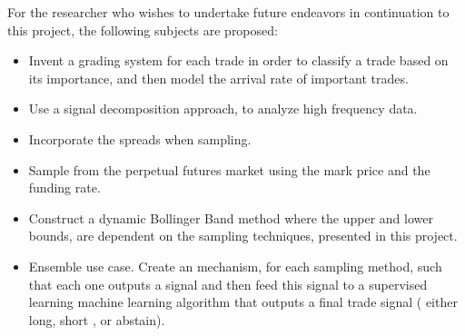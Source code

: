 For the researcher who wishes to undertake future endeavors in continuation to this project, the following subjects are proposed:
\begin{itemize}
\item Invent a grading system for each trade in order to classify a trade based on its importance, and then model the arrival rate of important trades.
\item Use a signal decomposition approach, to analyze high frequency data.
\item Incorporate the spreads when sampling.
\item Sample from the perpetual futures market using the mark price and the funding rate.
\item Construct a dynamic Bollinger Band method where the upper and lower bounds, are dependent on the sampling techniques, presented in this project.
\item Ensemble use case. Create an mechanism, for each sampling method, such that each one outputs a signal and then feed this signal to a supervised learning machine learning algorithm that outputs a final trade signal ( either long, short , or abstain).
\end{itemize}
 
